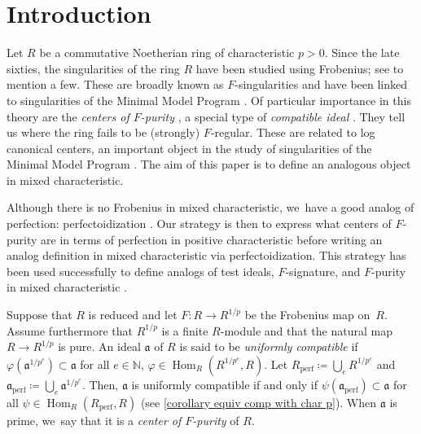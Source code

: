 \documentclass[JEP,XML,SOM,Unicode,published]{cedram}
\let\autoref\cref
\theoremstyle{plain}
\theoremstyle{definition}
\numberwithin{equation}{theorem}
\newcommand{\N}{\mathbb {N}}
\newcommand{\fra}{\mathfrak{a}}
\DeclareMathOperator{\Hom}{Hom}
\newcommand{\perf}{_{\mathrm{perf}}}
\newcommand{\unpe}{{1/{p^e}}}
\newcommand{\unp}{{1/{p}}}
\renewcommand{\phi}{\varphi}
\begin{document}
\mainmatter
\section{Introduction}

Let $R$ be a commutative Noetherian ring of characteristic $p>0$. Since the late sixties, the singularities of the ring $R$ have been studied using Frobenius; see \cite{KunzCharacterizationsOfRegularLocalRings,HochsterHunekeTC1,HochsterFoundations,HochsterHunekeTightClosureAndStrongFRegularity,SmithFRatImpliesRat,MehtaRamanathanFrobeniusSplittingAndCohomologyVanishing} to mention a few.
These are broadly known as $F$-singularities and have been linked to singularities of the Minimal Model Program \cite{SchwedeFInjectiveAreDuBois,SmithFRatImpliesRat,SmithMultiplierTestIdeals}.
Of particular importance in this theory are the \emph{centers of $F$-purity} \cite{SchwedeCentersOfFPurity}, a special type of \emph{compatible ideal} \cite{MehtaRamanathanFrobeniusSplittingAndCohomologyVanishing}. They tell us where the ring fails to be (strongly) $F$-regular.
These are related to log canonical centers, an important object in the study of singularities of the Minimal Model Program \cite{AmbroLCCENTERS}.
The aim of this paper is to define an analogous object in mixed characteristic.

Although there is no Frobenius in mixed characteristic, we~have a good analog of perfection: perfectoidization \cite{ScholzePerfectoidSpaces,BhattScholzePrisms}. Our strategy is then to express what centers of $F$-purity are in terms of perfection in positive characteristic before writing an analog definition in mixed characteristic via perfectoidization. This strategy has been used successfully to define analogs of test ideals, $F$-signature, and $F$-purity in mixed characteristic \cite{MaSchwedePerfectoidTestIdeal,CaiLeeMaSchwedeTuckerPerfectoidSignature,BMPSTWWPerfectoidPure}.

Suppose that $R$ is reduced and let $F\colon R\to R^\unp$ be the Frobenius map on~$R$. Assume furthermore that $R^\unp$ is a finite $R$\nobreakdash-module and that the natural map \hbox{$R\to R^\unp$} is pure. An ideal $\fra$ of $R$ is said to be \emph{uniformly compatible} if $\phi(\fra^\unpe)\subset \fra$ for all $e\in \N$, $\phi\in \Hom_R(R^\unpe,R)$. Let $R\perf\coloneqq \bigcup_e R^\unpe$ and $\fra\perf\coloneqq \bigcup_e \fra^\unpe$. Then, $\fra$ is uniformly compatible if and only if $\psi(\fra\perf)\subset \fra$ for all $\psi\in \Hom_R(R\perf,R)$
(see \autoref{corollary equiv comp with char p}).
When $\fra$ is prime, we~say that it is a \emph{center of $F$-purity} of $R$.
\end{document}
